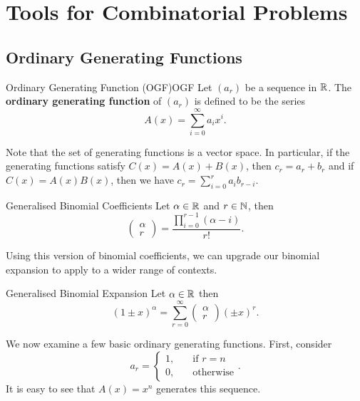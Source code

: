 \documentclass[math]{amznotes}
\theoremstyle{remark}
\newcommand{\0}{\mathbf{0}}
\newcommand{\1}{\mathbf{1}}
\begin{document}
\chapter{Tools for Combinatorial Problems}
\section{Ordinary Generating Functions}
\begin{dfnbox}{Ordinary Generating Function (OGF)}{OGF}
    Let $(a_r)$ be a sequence in $\mathbb{R}$. The {\color{red} \textbf{ordinary generating function}} of $(a_r)$ is defined to be the series
    \begin{equation*}
        A(x) = \sum_{i = 0}^{\infty}a_ix^i.
    \end{equation*}
\end{dfnbox}
Note that the set of generating functions is a vector space. In particular, if the generating functions satisfy $C(x) = A(x) + B(x)$, then $c_r = a_r + b_r$ and if $C(x) = A(x)B(x)$, then we have $c_r = \sum_{i = 0}^{r}a_ib_{r - i}$.
\begin{dfnbox}{Generalised Binomial Coefficients}{}
    Let $\alpha \in \mathbb{R}$ and $r \in \mathbb{N}$, then 
    \begin{equation*}
        \begin{pmatrix}
            \alpha \\
            r
        \end{pmatrix} = \frac{\prod_{i = 0}^{r - 1}(\alpha - i)}{r!}.
    \end{equation*}
\end{dfnbox}
Using this version of binomial coefficients, we can upgrade our binomial expansion to apply to a wider range of contexts.
\begin{dfnbox}{Generalised Binomial Expansion}{}
    Let $\alpha \in \mathbb{R}$ then 
    \begin{equation*}
        (1 \pm x)^\alpha = \sum_{r = 0}^{\infty}\begin{pmatrix}
            \alpha \\
            r
        \end{pmatrix}(\pm x)^r.
    \end{equation*}
\end{dfnbox}
We now examine a few basic ordinary generating functions. First, consider
\begin{equation*}
    a_r = \begin{cases}
        1, & \quad\textrm{if } r = n \\
        0, & \quad\textrm{otherwise}
    \end{cases}.
\end{equation*}
It is easy to see that $A(x) = x^n$ generates this sequence.
\end{document}
